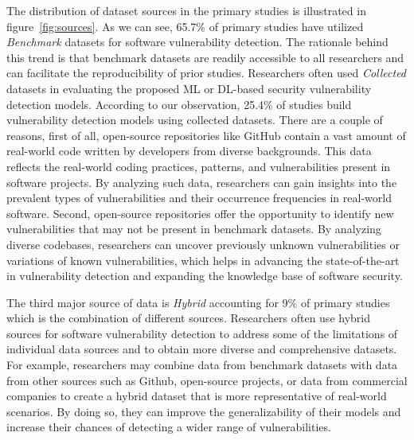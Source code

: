 The distribution of dataset sources in the primary studies is illustrated in figure~\ref{fig:sources}. As we can see, 65.7\% of primary studies have utilized \textit{Benchmark} datasets for software vulnerability detection. 
The rationale behind this trend is that benchmark datasets are readily accessible to all researchers and can facilitate the reproducibility of prior studies. 
Researchers often used \textit{Collected} datasets in evaluating the proposed ML or DL-based security vulnerability detection models. According to our observation, 25.4\% of studies build vulnerability detection models using collected datasets.  There are a couple of reasons, first of all, open-source repositories like GitHub contain a vast amount of real-world code written by developers from diverse backgrounds. This data reflects the real-world coding practices, patterns, and vulnerabilities present in software projects. By analyzing such data, researchers can gain insights into the prevalent types of vulnerabilities and their occurrence frequencies in real-world software. Second, open-source repositories offer the opportunity to identify new vulnerabilities that may not be present in benchmark datasets. By analyzing diverse codebases, researchers can uncover previously unknown vulnerabilities or variations of known vulnerabilities, which helps in advancing the state-of-the-art in vulnerability detection and expanding the knowledge base of software security.


The third major source of data is \textit{Hybrid} accounting for 9\% of primary studies which is the combination of different sources. Researchers often use hybrid sources for software vulnerability detection to address some of the limitations of individual data sources and to obtain more diverse and comprehensive datasets. For example, researchers may combine data from benchmark datasets with data from other sources such as Github, open-source projects, or data from commercial companies to create a hybrid dataset that is more representative of real-world scenarios. By doing so, they can improve the generalizability of their models and increase their chances of detecting a wider range of vulnerabilities. 


